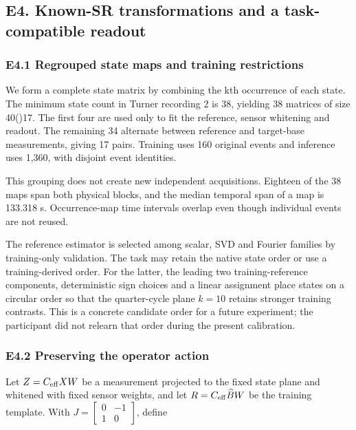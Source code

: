 \documentclass[11pt,a4paper]{article}
\begin{document}
\subsection{E4. Known-SR transformations and a task-compatible
readout}\label{e4.-known-sr-transformations-and-a-task-compatible-readout}

\subsubsection{E4.1 Regrouped state maps and training
restrictions}\label{e4.1-regrouped-state-maps-and-training-restrictions}

We form a complete state matrix by combining the kth occurrence of each
state. The minimum state count in Turner recording 2 is 38, yielding 38
matrices of size 40(\times)17. The first four are used only to fit the
reference, sensor whitening and readout. The remaining 34 alternate
between reference and target-base measurements, giving 17 pairs.
Training uses 160 original events and inference uses 1,360, with
disjoint event identities.

This grouping does not create new independent acquisitions. Eighteen of
the 38 maps span both physical blocks, and the median temporal span of a
map is 133.318 s. Occurrence-map time intervals overlap even though
individual events are not reused.

The reference estimator is selected among scalar, SVD and Fourier
families by training-only validation. The task may retain the native
state order or use a training-derived order. For the latter, the leading
two training-reference components, deterministic sign choices and a
linear assignment place states on a circular order so that the
quarter-cycle plane \(k=10\) retains stronger training contrasts. This
is a concrete candidate order for a future experiment; the participant
did not relearn that order during the present calibration.

\subsubsection{E4.2 Preserving the operator
action}\label{e4.2-preserving-the-operator-action}

Let \(Z=C_{\rm eff}XW\) be a measurement projected to the fixed state
plane and whitened with fixed sensor weights, and let
\(R=C_{\rm eff}\widehat BW\) be the training template. With
\(J=\left[\begin{smallmatrix}0&-1\\1&0\end{smallmatrix}\right]\), define
\end{document}
